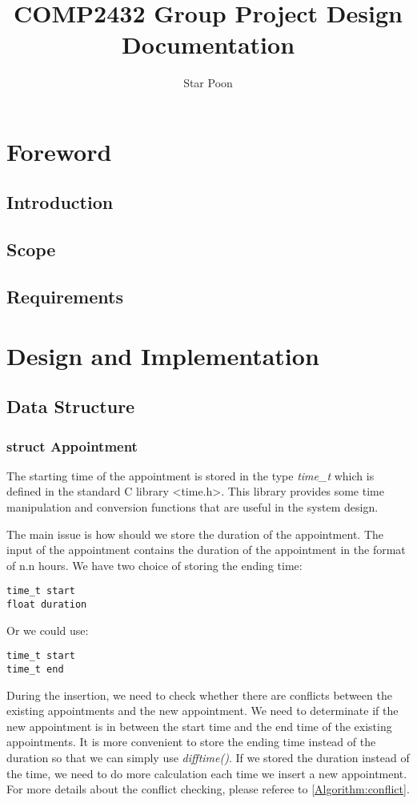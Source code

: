 \documentclass[12pt,a4paper]{report}
\author{Star Poon}
\title{COMP2432 Group Project Design Documentation}
\begin{document}
\maketitle
\chapter{Foreword}
\section{Introduction}
\section{Scope}
\section{Requirements}
\chapter{Design and Implementation}
\section{Data Structure}
\subsection{struct Appointment}
The starting time of the appointment is stored in the type \textit{time\_t} which is defined in the standard C library \textless time.h\textgreater. This library provides some time manipulation and conversion functions that are useful in the system design.

The main issue is how should we store the duration of the appointment. The input of the appointment contains the duration of the appointment in the format of n.n hours. We have two choice of storing the ending time:
\begin{lstlisting}
time_t start
float duration
\end{lstlisting}
Or we could use:
\begin{lstlisting}
time_t start
time_t end
\end{lstlisting}

During the insertion, we need to check whether there are conflicts between the existing appointments and the new appointment. We need to determinate if the new appointment is in between the start time and the end time of the existing appointments. It is more convenient to store the ending time instead of the duration so that we can simply use \textit{difftime()}. If we stored the duration instead of the time, we need to do more calculation each time we insert a new appointment. For more details about the conflict checking, please referee to \autoref{Algorithm:conflict}.
\end{document}
